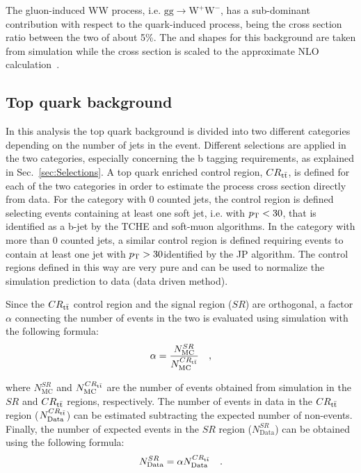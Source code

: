 The gluon-induced WW process, i.e. $\mathrm{gg\to W^{+}W^{-}}$, has a sub-dominant contribution with respect to the quark-induced process, being the cross section ratio between the two of about 5\%. The \mll and \mt shapes for this background are taken from simulation while the cross section is scaled to the approximate NLO calculation~\cite{Bonvini:2013jha,Passarino:2013bha}.





\subsection{Top quark background \label{sec:TTBackground}}

In this analysis the top quark background is divided into two different categories depending on the number of jets in the event. Different selections are applied in the two categories, especially concerning the b tagging requirements, as explained in Sec.~\ref{sec:Selections}.
A top quark enriched control region, $CR_{\mathrm{t}\bar{\mathrm{t}}}$, is defined for each of the two categories in order to estimate the process cross section directly from data. For the category with 0 counted jets, the control region is defined selecting events containing at least one soft jet, i.e. with $p_\mathrm{T} < 30$\GeV, that is identified as a b-jet by the TCHE and soft-muon algorithms. In the category with more than 0 counted jets, a similar control region is defined requiring events to contain at least one jet with $p_\mathrm{T}>30$\GeV identified by the JP algorithm. The control regions defined in this way are very pure and can be used to normalize the simulation prediction to data (data driven method).

Since the $CR_{\mathrm{t}\bar{\mathrm{t}}}$ control region and the signal region ($SR$) are orthogonal, a factor $\alpha$ connecting the number of events in the two is evaluated using simulation with the following formula:
\begin{equation}
\alpha = \frac{N_\mathrm{MC}^{SR}}{N_\mathrm{MC}^{CR_{\mathrm{t}\bar{\mathrm{t}}}}} \quad ,
\end{equation}

\noindent where $N_\mathrm{MC}^{SR}$ and $N_\mathrm{MC}^{CR_{\mathrm{t}\bar{\mathrm{t}}}}$ are the number of \ttbar events obtained from simulation in the $SR$ and $CR_{\mathrm{t}\bar{\mathrm{t}}}$ regions, respectively. The number of \ttbar events in data in the $CR_{\mathrm{t}\bar{\mathrm{t}}}$ region ($N_\mathrm{Data}^{CR_{\mathrm{t}\bar{\mathrm{t}}}}$) can be estimated subtracting the expected number of non-\ttbar events. Finally, the number of expected events in the $SR$ region ($N_\mathrm{Data}^{SR}$) can be obtained using the following formula:
\begin{equation}
N_\mathrm{Data}^{SR} = \alpha N_\mathrm{Data}^{CR_{\mathrm{t}\bar{\mathrm{t}}}} \quad .
\end{equation}

